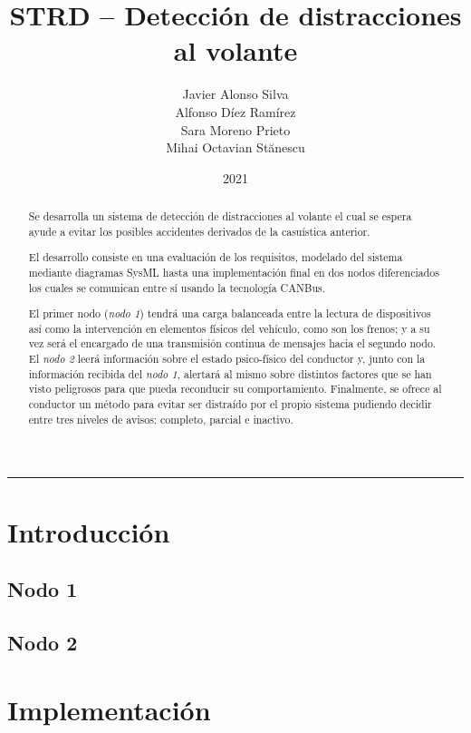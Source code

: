 \documentclass[a4paper,oneside,12pt]{article}
\author{Javier Alonso Silva\\Alfonso Díez Ramírez\\Sara Moreno Prieto\\Mihai Octavian St\u{a}nescu}
\title{STRD -- Detección de distracciones al volante}
\date{2021}
\newcommand{\settttsize}[1]{\def\ttsize{#1}}%
\begin{document}
\settttsize{\footnotesize}
\ActivateVerbatimLigatures
\maketitle
\begin{abstract}
    Se desarrolla un sistema de detección de distracciones al volante el
    cual se espera ayude a evitar los posibles accidentes derivados de
    la casuística anterior.

    El desarrollo consiste en una evaluación de los requisitos, modelado del
    sistema mediante diagramas SysML hasta una implementación final en dos
    nodos diferenciados los cuales se comunican entre sí usando la tecnología
    CANBus.

    El primer nodo (\textit{nodo 1}) tendrá una carga balanceada entre la lectura
    de dispositivos así como la intervención en elementos físicos del vehículo,
    como son los frenos; y a su vez será el encargado de una transmisión continua
    de mensajes hacia el segundo nodo. El \textit{nodo 2} leerá información sobre
    el estado psico-físico del conductor y, junto con la información recibida del
    \textit{nodo 1}, alertará al mismo sobre distintos factores que se han visto
    peligrosos para que pueda reconducir su comportamiento. Finalmente, se ofrece
    al conductor un método para evitar ser distraído por el propio sistema pudiendo
    decidir entre tres niveles de avisos: completo, parcial e inactivo.
\end{abstract}
%
\rule{\linewidth}{.2pt}
\newpage
\tableofcontents
\newpage


\section{Introducción}


\subsection{Nodo 1}


\subsection{Nodo 2}


\section{Implementación}

\end{document}

